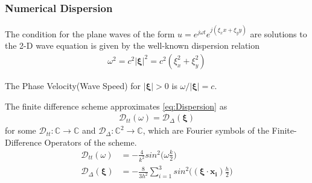 \documentclass{beamer}
\begin{document}
\begin{frame}
\frametitle{Numerical Dispersion}

The condition for the plane waves of the form $u = e^{j\omega t} e^{j(\xi_x x + \xi_y y)}$ are solutions to the 2-D wave equation is given by the well-known dispersion relation
\begin{align}
\omega^2 = c^2 |\mathbf{\xi}|^2 = c^2 (\xi_x^2 + \xi_y^2) \label{eq:Dispersion}
\end{align}

The Phase Velocity(Wave Speed) for $|\mathbf{\xi}| > 0$ is $\omega / |\mathbf{\xi}| = c$.

The finite difference scheme approximates \eqref{eq:Dispersion} as
\begin{align}
\mathcal{D}_{tt}(\omega) = \mathcal{D}_{\Delta}(\mathbf{\xi}) \label{eq:DispersionFreqDomain}
\end{align}
for some $\mathcal{D}_{tt}: \mathbb{C} \rightarrow \mathbb{C}$ and $\mathcal{D}_{\Delta}: \mathbb{C}^2 \rightarrow \mathbb{C}$, which are Fourier symbols of the Finite-Difference Operators of the scheme. 
\begin{align}
\mathcal{D}_{tt}(\omega) &= -\frac{4}{k^2}sin^2\big(\omega \frac{k}{2}\big)\\
\mathcal{D}_{\Delta}(\mathbf{\xi}) &= -\frac{8}{3h^2} \sum_{i=1}^{3} sin^2\big((\mathbf{\xi}\cdot \mathbf{x_i})\frac{h}{2}\big)
\end{align}
\end{frame}


\end{document}
